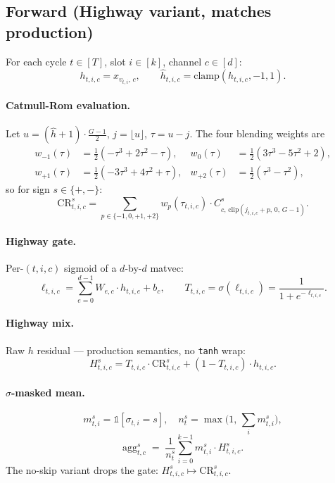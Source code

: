 \documentclass[11pt,a4paper]{article}
\begin{document}
\subsection{Forward (Highway variant, matches production)}

For each cycle $t \in [T]$, slot $i \in [k]$, channel $c \in [d]$:
\[
h_{t,i,c} = x_{v_{t,i},\,c}, \qquad
\hat h_{t,i,c} = \mathrm{clamp}(h_{t,i,c}, -1, 1).
\]

\paragraph{Catmull-Rom evaluation.}
Let $u = (\hat h + 1) \cdot \tfrac{G-1}{2}$, $j = \lfloor u \rfloor$, $\tau = u - j$. The four blending weights are
\begin{align*}
w_{-1}(\tau) &= \tfrac{1}{2}(-\tau^3 + 2\tau^2 - \tau), &
w_{0}(\tau)  &= \tfrac{1}{2}(3\tau^3 - 5\tau^2 + 2),\\
w_{+1}(\tau) &= \tfrac{1}{2}(-3\tau^3 + 4\tau^2 + \tau), &
w_{+2}(\tau) &= \tfrac{1}{2}(\tau^3 - \tau^2),
\end{align*}
so for sign $s \in \{+,-\}$:
\[
\mathrm{CR}^{s}_{t,i,c}
 = \sum_{p \in \{-1,0,+1,+2\}} w_p(\tau_{t,i,c}) \cdot
   C^{s}_{c,\,\mathrm{clip}(j_{t,i,c}+p,\,0,\,G-1)}.
\]

\paragraph{Highway gate.}
Per-$(t,i,c)$ sigmoid of a $d$-by-$d$ matvec:
\[
\ell_{t,i,c} = \sum_{e=0}^{d-1} W_{e,c} \cdot h_{t,i,e} + b_c,
\qquad
T_{t,i,c} = \sigma(\ell_{t,i,c}) = \frac{1}{1 + e^{-\ell_{t,i,c}}}.
\]

\paragraph{Highway mix.}
Raw $h$ residual --- production semantics, no \texttt{tanh} wrap:
\[
H^{s}_{t,i,c} = T_{t,i,c} \cdot \mathrm{CR}^{s}_{t,i,c}
              + (1 - T_{t,i,c}) \cdot h_{t,i,c}.
\]

\paragraph{$\sigma$-masked mean.}
\[
m^{s}_{t,i} = \mathbb{1}[\sigma_{t,i} = s], \quad
n^{s}_{t} = \max\!\Big(1,\, \sum_{i} m^{s}_{t,i}\Big),
\]
\[
\boxed{\;
\mathrm{agg}^{s}_{t,c} \;=\; \frac{1}{n^{s}_{t}} \sum_{i=0}^{k-1} m^{s}_{t,i} \cdot H^{s}_{t,i,c}.
\;}
\]
The no-skip variant drops the gate: $H^{s}_{t,i,c} \mapsto \mathrm{CR}^{s}_{t,i,c}$.
\end{document}
